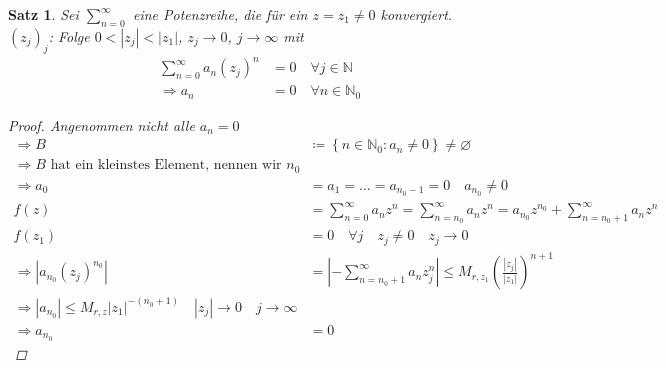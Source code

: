 \documentclass[11pt, twoside, a4paper]{article}
\theoremstyle{plain}
\newtheorem{satz}[blockelement]{Satz}
\newcommand{\set}[1]{\left\{#1\right\}}
\newcommand{\pair}[1]{\left(#1\right)}
\newcommand{\abs}[1]{\left\lvert#1\right\rvert}
\newcommand{\impl}[0]{\Rightarrow{}}
\newcommand{\fromto}{\rightarrow{}}
\newcommand{\definedas}[0]{\coloneqq}
\renewcommand{\emptyset}{\varnothing}
\newcommand{\N}{\mathbb{N}}
\begin{document}
    \begin{satz} %
        \marginnote{[18. Jan]}

        Sei $ \sum_{n=0}^{\infty}$ eine Potenzreihe, die für ein $z=z_1\neq 0$ konvergiert.\\
        $(z_j)_j$: Folge $0< \abs{z_j} < \abs{z_1}$, $z_j \fromto 0$, $j\fromto\infty$ mit
        \begin{align*}
            \sum_{n=0}^{\infty} a_n (z_j)^n &= 0\quad\forall j\in\N\\
            \impl a_n &= 0\quad\forall n\in\N_0
        \end{align*}
        \begin{proof}
            Angenommen nicht alle $a_n=0$
            \begin{align*}
                \impl B &\definedas \set{n\in\N_0: a_n \neq 0} \neq \emptyset\\
                \impl B \text{ hat ein kleinstes Element, nennen wir } n_0\\
                \impl a_0 &= a_1 = \dots = a_{n_0-1} = 0\quad a_{n_0}\neq 0\\
                f(z) &= \sum_{n=0}^{\infty} a_n z^n = \sum_{n=n_0}^{\infty} a_n z^n = a_{n_0} z^{n_0} + \sum_{n=n_0 + 1}^{\infty} a_n z^n\\
                f(z_1) &= 0\quad\forall j\quad z_j \neq 0\quad z_j\fromto 0\\
                \impl \abs{a_{n_0} (z_j)^{n_0}} &= \abs{- \sum_{n=n_0 + 1}^{\infty} a_n z_j^n} \leq M_{r, z_1} \pair{\frac{\abs{z_j}}{\abs{z_1}}}^{n+1}\\
                \impl \abs{a_{n_0}} \leq M_{r,z} \abs{z_1}^{-(n_0+1)}\quad \abs{z_j} \fromto 0\quad j\fromto\infty\\
                \impl a_{n_0} &= 0\tag{Widerspruch}
            \end{align*}
        \end{proof}
    \end{satz}
\end{document}
